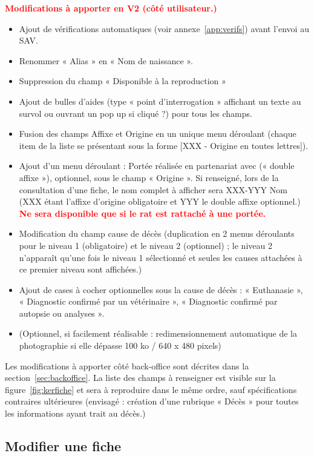 \documentclass[a4paper,10pt]{article}
\newcommand\desire[1]{\noindent\textbf{\textcolor{red}{#1}}}
\begin{document}
\noindent\desire{Modifications à apporter en V2 (côté utilisateur.)}
\begin{itemize}
\item Ajout de vérifications automatiques (voir annexe~\ref{app:verifs}) avant l'envoi au SAV.
\item Renommer « Alias » en « Nom de naissance ».
\item Suppression du champ « Disponible à la reproduction »
\item Ajout de bulles d'aides (type « point d'interrogation » affichant un texte au survol ou ouvrant un pop up si cliqué ?) pour tous les champs.
\item Fusion des champs Affixe et Origine en un unique menu déroulant (chaque item de la liste se présentant sous la forme [XXX - Origine en toutes lettres]).
\item Ajout d'un menu déroulant : Portée réalisée en partenariat avec (« double affixe »), optionnel, sous le champ « Origine ». Si renseigné, lors de la consultation d'une fiche, le nom complet à afficher sera XXX-YYY Nom (XXX étant l'affixe d'origine obligatoire et YYY le double affixe optionnel.) \desire{Ne sera disponible que si le rat est rattaché à une portée.}
\item Modification du champ cause de décès (duplication en 2 menus déroulants pour le niveau 1 (obligatoire) et le niveau 2 (optionnel) ; le niveau 2 n'apparaît qu'une fois le niveau 1 sélectionné et seules les causes attachées à ce premier niveau sont affichées.)
\item Ajout de cases à cocher optionnelles sous la cause de décès : « Euthanasie », « Diagnostic confirmé par un vétérinaire », « Diagnostic confirmé par autopsie ou analyses ».       
\item (Optionnel, si facilement réalisable : redimensionnement automatique de la photographie si elle dépasse 100 ko / 640 x 480 pixels)
\end{itemize}

Les modifications à apporter côté back-office sont décrites dans la section~\ref{sec:backoffice}. La liste des champs à renseigner est visible sur la figure~\ref{fig:kerfiche} et sera à reproduire dans le même ordre, sauf spécifications contraires ultérieures (envisagé : création d'une rubrique « Décès » pour toutes les informations ayant trait au décès.)     

\subsection{Modifier une fiche}
\end{document}
